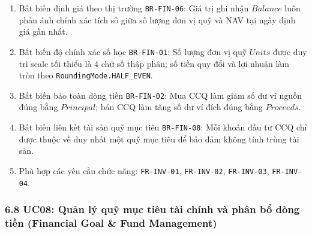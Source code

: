 \documentclass[11pt,a4paper]{article}
\providecommand{\tightlist}{
  \setlength{\itemsep}{0pt}\setlength{\parskip}{0pt}}
\begin{document}
\begin{itemize}
  \begin{enumerate}
  \def\labelenumi{\arabic{enumi}.}
  \tightlist
  \item
    Bất biến định giá theo thị trường \texttt{BR-FIN-06}: Giá trị ghi
    nhận \(Balance\) luôn phản ánh chính xác tích số giữa số lượng đơn
    vị quỹ và NAV tại ngày định giá gần nhất.
  \item
    Bất biến độ chính xác số học \texttt{BR-FIN-01}: Số lượng đơn vị quỹ
    \(Units\) được duy trì scale tối thiểu là 4 chữ số thập phân; số
    tiền quy đổi và lợi nhuận làm tròn theo
    \texttt{RoundingMode.HALF\_EVEN}.
  \item
    Bất biến bảo toàn dòng tiền \texttt{BR-FIN-02}: Mua CCQ làm giảm số
    dư ví nguồn đúng bằng \(Principal\); bán CCQ làm tăng số dư ví đích
    đúng bằng \(Proceeds\).
  \item
    Bất biến liên kết tài sản quỹ mục tiêu \texttt{BR-FIN-08}: Mỗi khoản
    đầu tư CCQ chỉ được thuộc về duy nhất một quỹ mục tiêu để bảo đảm
    không tính trùng tài sản.
  \item
    Phù hợp các yêu cầu chức năng: \texttt{FR-INV-01},
    \texttt{FR-INV-02}, \texttt{FR-INV-03}, \texttt{FR-INV-04}.
  \end{enumerate}
\end{itemize}

\subsubsection{6.8 UC08: Quản lý quỹ mục tiêu tài chính và phân bổ dòng
tiền (Financial Goal \& Fund
Management)}\label{68-uc08-quux1ea3n-luxfd-quux1ef9-mux1ee5c-tiuxeau-tuxe0i-chuxednh-vuxe0-phuxe2n-bux1ed5-duxf2ng-tiux1ec1n-financial-goal--fund-management}
\end{document}
